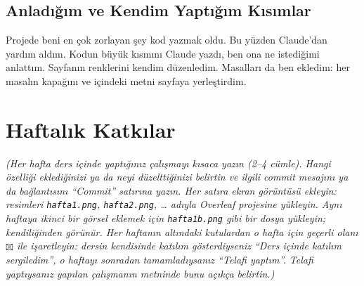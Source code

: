 \documentclass[12pt,a4paper]{article}
\newcommand{\aciklama}[1]{{\color{gray}\itshape (#1)}}
\begin{document}
\subsection{Anladığım ve Kendim Yaptığım Kısımlar}
Projede beni en çok zorlayan şey kod yazmak oldu. Bu yüzden Claude'dan yardım aldım. Kodun büyük kısmını Claude yazdı, ben ona ne istediğimi anlattım. Sayfanın renklerini kendim düzenledim. Masalları da ben ekledim: her masalın kapağını ve içindeki metni sayfaya yerleştirdim.

\section{Haftalık Katkılar}
\aciklama{Her hafta ders içinde yaptığınız çalışmayı kısaca yazın (2--4 cümle). Hangi
özelliği eklediğinizi ya da neyi düzelttiğinizi belirtin ve ilgili commit mesajını
ya da bağlantısını ``Commit'' satırına yazın. Her satıra ekran görüntüsü ekleyin:
resimleri \texttt{hafta1.png}, \texttt{hafta2.png}, \ldots{} adıyla Overleaf
projesine yükleyin. Aynı haftaya ikinci bir görsel eklemek için
\texttt{hafta1b.png} gibi bir dosya yükleyin; kendiliğinden görünür.
Her haftanın altındaki kutulardan o hafta için geçerli olanı $\boxtimes$ ile
işaretleyin: dersin kendisinde katılım gösterdiyseniz ``Ders içinde katılım
sergiledim'', o haftayı sonradan tamamladıysanız ``Telafi yaptım''. Telafi
yaptıysanız yapılan çalışmanın metninde bunu açıkça belirtin.}
\end{document}
